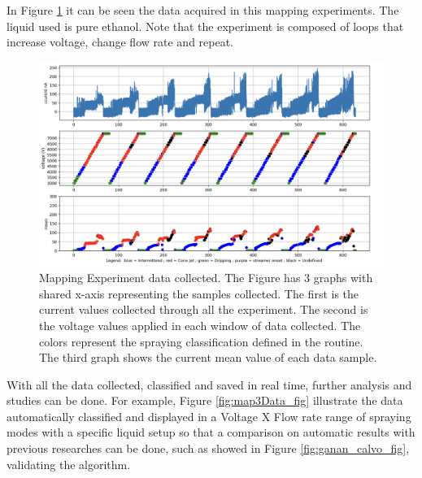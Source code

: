     In Figure \ref{fig:map2Data_fig} it can be seen the data acquired in this mapping experiments. The liquid used is pure ethanol. 
    Note that the experiment is composed of loops that increase voltage, change flow rate and repeat.

    \begin{figure}[H]
        \center
        \includegraphics[width=15cm]{Figuras/report2/map2Data.png}
        \caption{Mapping Experiment data collected. The Figure has 3 graphs with shared x-axis representing the samples collected. The first is the current values collected through all the experiment.
        The second is the voltage values applied in each window of data collected. The colors represent the spraying classification defined in the routine.
        The third graph shows the current mean value of each data sample.}
        \label{fig:map2Data_fig}
    \end{figure}

    With all the data collected, classified and saved in real time, further analysis and studies can be done. For example, Figure \ref{fig:map3Data_fig} illustrate the data automatically classified and displayed in a Voltage X Flow rate range of spraying modes with a specific liquid setup so that a comparison on automatic results with previous researches can be done, such as showed in Figure \ref{fig:ganan_calvo_fig}, validating the algorithm.

